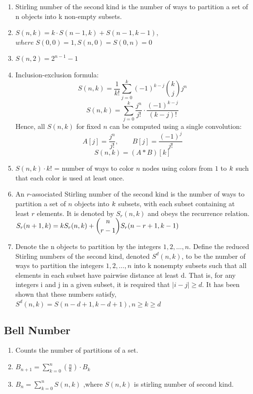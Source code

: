 \begin{enumerate}[resume]
    \item Stirling number of the second kind is the number of ways to partition a set of n objects into k non-empty subsets.
    \item $S(n,k)=k \cdot S(n-1,k)+S(n-1,k-1)$,
          \(where \; S(0,0)=1,S(n,0)=S(0,n)=0\)
    \item $S(n,2)=2^{n-1}-1$
    \item Inclusion-exclusion formula:
      \[
      S(n,k)=\frac{1}{k!}\sum_{j=0}^{k}(-1)^{k-j}\binom{k}{j}j^n
      \]
      \[
      S(n,k)=\sum_{j=0}^{k}
      \frac{j^n}{j!}\cdot\frac{(-1)^{k-j}}{(k-j)!}
      \]
      Hence, all $S(n,k)$ for fixed $n$ can be computed using a single convolution:
      \[
      A[j]=\frac{j^n}{j!},\qquad B[j]=\frac{(-1)^j}{j!}
      \]
      \[
      S(n,k)=(A*B)[k]
      \]
    \item $S(n,k) \cdot k!$ = number of ways to color $n$ nodes using colors from $\displaystyle 1$ to $\displaystyle \displaystyle k$ such that each color is used at least once.
    \item An $r$-associated Stirling number of the second kind is the number of ways to partition a set of $n$ objects into $\displaystyle \displaystyle k$ subsets, with each subset containing at least $r$ elements. It is denoted by $S_r( n , k )$ and obeys the recurrence relation.
          $\displaystyle \displaystyle S_r(n+1,k) = k S_r(n,k) + \binom{n}{r-1} S_r(n-r+1,k-1)$
    \item Denote the n objects to partition by the integers $\displaystyle 1, 2, \dots, n$. Define the reduced Stirling numbers of the second kind, denoted $S^d(n, k)$, to be the number of ways to partition the integers $\displaystyle 1, 2, \dots, n$ into k nonempty subsets such that all elements in each subset have pairwise distance at least d.
          That is, for any integers i and j in a given subset, it is required that $|i - j| \geq d$. It has been shown that these numbers satisfy,
          \(S^d(n, k) = S(n - d + 1, k - d + 1), n \geq k \geq d\)
\end{enumerate}

\subsection{Bell Number}

\begin{enumerate}[resume]
    \item Counts the number of partitions of a set.
    \item $B_{n+1}=\displaystyle\sum_{k=0}^{n}\left(\frac{n}{k}\right) \cdot B_{k}$
    \item $B_{n}=\displaystyle\sum_{k=0}^{n}S(n,k)$ ,where $S(n,k)$ is stirling number of second kind.
\end{enumerate}


